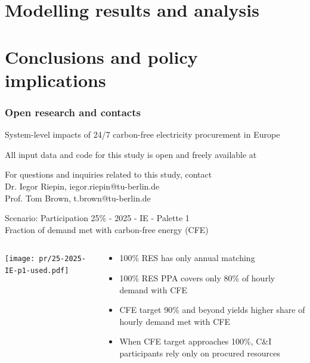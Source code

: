 \section{Modelling results and analysis}


\section{Conclusions and policy implications}


\begin{frame}
  \frametitle{Open research and contacts}

  {\Large
  \alert{System-level impacts of 24/7 carbon-free electricity procurement in Europe}
  }

  \vspace{.3cm}
  All input data and code for this study is open and freely available at \\

  \vspace{.3cm}
  For questions and inquiries related to this study, contact \\
  Dr. Iegor Riepin, iegor.riepin@tu-berlin.de \\
  Prof. Tom Brown, t.brown@tu-berlin.de

\end{frame}




\begin{frame}{Scenario: Participation 25\% - 2025 - IE - Palette 1 
\\ Fraction of demand met with carbon-free energy (CFE)}
\begin{columns}[T]
\begin{column}{9cm}
\centering

\texttt{[image: pr/25-2025-IE-p1-used.pdf]}
\end{column}
\begin{column}{5cm}

  \begin{itemize}
  \item 100\% RES has only \alert{annual matching}
  \item 100\% RES PPA covers \alert{only 80\%} of hourly demand with CFE
  \item CFE target \alert{90\%} and beyond yields higher share of hourly demand met with CFE
  \item When CFE target approaches 100\%, C\&I participants rely \alert{only on procured resources}
  \end{itemize}
  
\end{column}
\end{columns}

\end{frame}



